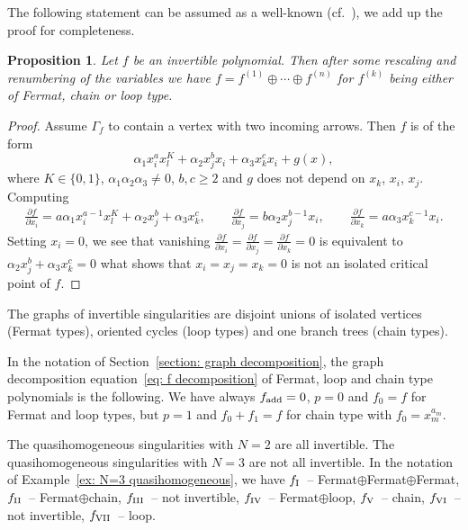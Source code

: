 \documentclass[pdftex]{sigma}
\numberwithin{equation}{section}
\newtheorem{Proposition}[Theorem]{Proposition}
 { \theoremstyle{definition}
\newtheorem{Definition}[Theorem]{Definition}
\newtheorem{Note}[Theorem]{Note}
\newtheorem{Example}[Theorem]{Example}
\newtheorem{Remark}[Theorem]{Remark} }
\def\p{\partial }
\begin{document}
The following statement can be assumed as a well-known (cf.~\cite{KS}), we add up the proof for completeness.
\begin{Proposition}\label{prop: invertible polynomial classification}
	Let $f$ be an invertible polynomial. Then after some rescaling and renumbering of the variables we have $f = f^{(1)} \oplus \cdots \oplus f^{(n)}$ for $f^{(k)}$ being either of Fermat, chain or loop type.
\end{Proposition}
\begin{proof}
Assume $\Gamma_f$ to contain a vertex with two incoming arrows. Then $f$ is of the form
\[
	\alpha_1 x_i^a x_l^K + \alpha_2 x_j^bx_i + \alpha_3 x_k^cx_i + g(x),
\]
where $K \in \{ 0,1\}$, $\alpha_1\alpha_2\alpha_3 \neq 0$, $b,c \ge 2$ and $g$ does not depend on $x_k$, $x_i$, $x_j$. Computing
\begin{align*}
	\frac{\p f}{\p x_i}  = a \alpha_1 x_i^{a-1} x_l^K + \alpha_2 x_j^b + \alpha_3 x_k^c,
	\qquad
	\frac{\p f}{\p x_j}  = b \alpha_2 x_j^{b-1}x_i,
	\qquad
	\frac{\p f}{\p x_k} = a \alpha_3 x_k^{c-1}x_i.
\end{align*}
Setting $x_i = 0$, we see that vanishing $\frac{\p f}{\p x_i} = \frac{\p f}{\p x_j} =\frac{\p f}{\p x_k} =0$ is equivalent to $\alpha_2 x_j^b + \alpha_3 x_k^c = 0$ what shows that $x_i=x_j=x_k=0$ is not an isolated critical point of $f$.
\end{proof}

The graphs of invertible singularities are disjoint unions of isolated vertices (Fermat types), oriented cycles (loop types) and one branch trees (chain types).

In the notation of Section~\ref{section: graph decomposition}, the graph decomposition equation~\eqref{eq: f decomposition} of Fermat, loop and chain type polynomials is the following. We have always $f_{\rm add} = 0$, $p=0$ and $f_0 = f$ for Fermat and loop types, but $p=1$ and $f_0 + f_1 = f$ for chain type with $f_0 = x_m^{a_m}$.

\begin{Example}
 The quasihomogeneous singularities with $N=2$ are all invertible.
	The quasihomogeneous singularities with $N=3$ are not all invertible. In the notation of Example~\ref{ex: N=3 quasihomogeneous}, we have $f_{\rm I}$~-- Fermat$\oplus$Fermat$\oplus$Fermat, $f_{\rm II}$~-- Fermat$\oplus$chain, $f_{\rm III}$~-- not invertible, $f_{\rm IV} $~-- Fermat$\oplus$loop,
	$f_{\rm V}$~-- chain, $f_{\rm VI}$~-- not invertible, $f_{\rm VII}$~-- loop.
\end{Example}
\end{document}
